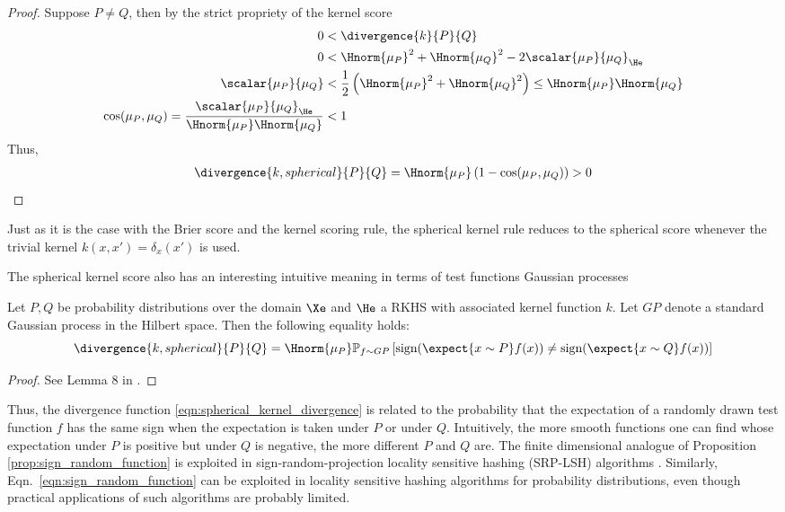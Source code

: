 \begin{theorem} 
\begin{proof}
	Suppose $P\neq Q$, then by the strict propriety of the kernel score
	\begin{align}
		0 &< \divergence{k}{P}{Q}\\
		0 &< \Hnorm{\mu_P}^2 + \Hnorm{\mu_Q}^2 - 2\scalar{\mu_P}{\mu_Q} _{\He}\\
		\scalar{\mu_P}{\mu_Q} &< \frac{1}{2}\left(\Hnorm{\mu_P}^2 + \Hnorm{\mu_Q}^2\right) \leq \Hnorm{\mu_P}\Hnorm{\mu_Q}\\
		\cos(\mu_P,\mu_Q) = \frac{\scalar{\mu_P}{\mu_Q} _{\He}}{\Hnorm{\mu_P}\Hnorm{\mu_Q}} &< 1
	\end{align}
	Thus,
	\begin{align}
		\divergence{k,spherical}{P}{Q} = \Hnorm{\mu_P} \left( 1 - \cos(\mu_P, \mu_Q)\right) > 0
	\end{align}
\end{proof}
\end{theorem}

Just as it is the case with the Brier score and the kernel scoring rule, the spherical kernel rule reduces to the spherical score whenever the trivial kernel $k(x,x') = \delta_{x}(x')$ is used.

The spherical kernel score also has an interesting intuitive meaning in terms of test functions Gaussian processes

\begin{proposition}\label{prop:sign_random_function}
Let $P,Q$ be probability distributions over the domain $\Xe$ and $\He$ a RKHS with associated kernel function $k$. Let $GP$ denote a standard Gaussian process in the Hilbert space. Then the following equality holds:
\begin{equation}
	 \divergence{k,spherical}{P}{Q} = \Hnorm{\mu_P} \mathbb{P}_{f\sim GP} \left[ \mbox{sign}(\expect{x\sim P} f(x)) \neq \mbox{sign}(\expect{x\sim Q} f(x)) \right] \label{eqn:sign_random_function}
\end{equation}
\begin{proof}
See Lemma 8 in \citep{Goemans1995}.
\end{proof}
\end{proposition}

Thus, the divergence function \eqref{eqn:spherical_kernel_divergence} is related to the probability that the expectation of a randomly drawn test function $f$ has the same sign when the expectation is taken under $P$ or under $Q$. Intuitively, the more smooth functions one can find whose expectation under $P$ is positive but under $Q$ is negative, the more different $P$ and $Q$ are. The finite dimensional analogue of Proposition \ref{prop:sign_random_function} is exploited in sign-random-projection locality sensitive hashing (SRP-LSH) algorithms \citep{Charikar2002,Ji2012}. Similarly, Eqn.\ \eqref{eqn:sign_random_function} can be exploited in locality sensitive hashing algorithms for probability distributions, even though practical applications of such algorithms are probably limited.

